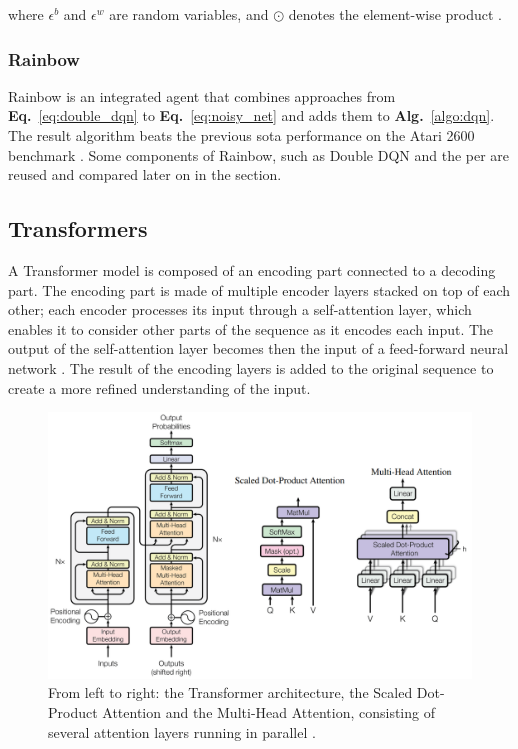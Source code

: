 where $\epsilon^b$ and $\epsilon^w$ are random variables, and $\odot$ denotes the element-wise product \cite{rainbow}.

\subsubsection{Rainbow}
Rainbow is an integrated agent that combines approaches from \textbf{Eq.}~\ref{eq:double_dqn} to \textbf{Eq.}~\ref{eq:noisy_net} and adds them to \textbf{Alg.}~\ref{algo:dqn}. The result algorithm beats the previous \acrshort{sota} performance on the Atari 2600 benchmark \cite{rainbow}. Some components of Rainbow, such as Double DQN and the \acrlong{per} are reused and compared later on in the  section.

\subsection{Transformers}
A Transformer model is composed of an encoding part connected to a decoding part. The encoding part is made of multiple encoder layers stacked on top of each other; each encoder processes its input through a self-attention layer, which enables it to consider other parts of the sequence as it encodes each input. The output of the self-attention layer becomes then the input of a feed-forward neural network \cite{attention_is_all_you_need}. The result of the encoding layers is added to the original sequence to create a more refined understanding of the input.

\begin{figure}[!htbp]
\centering
\includegraphics[width=\textwidth]{images/transformer.png}
\caption{From left to right: the Transformer architecture, the Scaled Dot-Product Attention and the Multi-Head Attention, consisting of several attention layers running in parallel \cite{attention_is_all_you_need}.}
\label{fig:transformer}
\end{figure}

